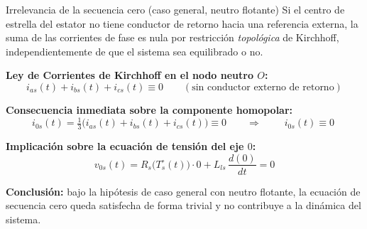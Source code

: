\documentclass[aspectratio=169,t]{beamer}
\begin{document}
\begin{frame}{Irrelevancia de la secuencia cero (caso general, neutro flotante)}
{\small\color{uncGray}Si el centro de estrella del estator no tiene conductor de retorno hacia una referencia externa, la suma de las corrientes de fase es nula por restricción \emph{topológica} de Kirchhoff, independientemente de que el sistema sea equilibrado o no.}\par
\vspace{4mm}

\textbf{Ley de Corrientes de Kirchhoff en el nodo neutro $O$:}
\begin{equation*}
i_{as}(t) + i_{bs}(t) + i_{cs}(t) \equiv 0
\qquad (\text{sin conductor externo de retorno})
\end{equation*}

\textbf{Consecuencia inmediata sobre la componente homopolar:}
\begin{equation*}
i_{0s}(t) = \tfrac{1}{3}\big(i_{as}(t) + i_{bs}(t) + i_{cs}(t)\big) \equiv 0
\qquad\Longrightarrow\qquad
\boxed{\;i_{0s}(t) \equiv 0\;}
\end{equation*}

\textbf{Implicación sobre la ecuación de tensión del eje $0$:}
\begin{equation*}
v_{0s}(t) = R_s\!\big(T_s^\circ(t)\big)\cdot 0 + L_{ls}\,\frac{d(0)}{dt} = 0
\end{equation*}

{\small \textbf{Conclusión:} bajo la hipótesis de caso general con neutro flotante, la ecuación de secuencia cero queda satisfecha de forma trivial y no contribuye a la dinámica del sistema.}
\end{frame}
\end{document}
